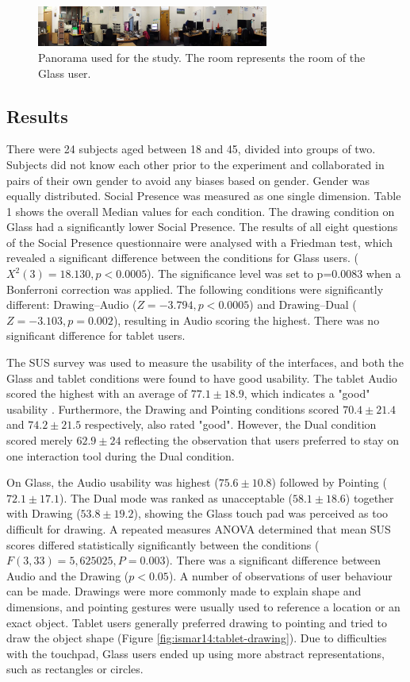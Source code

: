 \begin{figure}[ht]
	\centering
	\includegraphics[width=3in]{images/ismar14/envrionment-setup}
	\caption{Panorama used for the study. The room represents the room of the Glass user.}
	\label{fig:ismar14:envrionment-setup}
\end{figure}

\subsection{Results}

There were 24 subjects aged between 18 and 45, divided into groups of two. Subjects did not know each other prior to the experiment and collaborated in pairs of their own gender to avoid any biases based on gender. Gender was equally distributed. Social Presence was measured as one single dimension. Table 1 shows the overall Median values for each condition. The drawing condition on Glass had a significantly lower Social Presence. The results of all eight questions of the Social Presence questionnaire were analysed with a Friedman test, which revealed a significant difference between the conditions for Glass users. ($X^2(3)=18.130, p<0.0005$). The significance level was set to p=0.0083 when a Bonferroni correction was applied. The following conditions were significantly different: Drawing–Audio ($Z=-3.794, p<0.0005$) and Drawing–Dual ($Z=-3.103, p=0.002$), resulting in Audio scoring the highest. There was no significant difference for tablet users.

The SUS survey was used to measure the usability of the interfaces, and both the Glass and tablet conditions were found to have good usability. The tablet Audio scored the highest with an average of $77.1\pm18.9$, which indicates a "good" usability \cite{Bangor2008}. Furthermore, the Drawing and Pointing conditions scored $70.4\pm21.4$ and $74.2\pm21.5$ respectively, also rated "good". However, the Dual condition scored merely $62.9\pm24$ reflecting the observation that users preferred to stay on one interaction tool during the Dual condition.

On Glass, the Audio usability was highest ($75.6\pm10.8$) followed by Pointing ($72.1\pm17.1$). The Dual mode was ranked as unacceptable ($58.1\pm18.6$) together with Drawing ($53.8\pm19.2$), showing the Glass touch pad was perceived as too difficult for drawing. A repeated measures ANOVA determined that mean SUS scores differed statistically significantly between the conditions ($F(3, 33)=5,625025, P=0.003$). There was a significant difference between Audio and the Drawing ($p<0.05$). A number of observations of user behaviour can be made. Drawings were more commonly made to explain shape and dimensions, and pointing gestures were usually used to reference a location or an exact object. Tablet users generally preferred drawing to pointing and tried to draw the object shape (Figure \ref{fig:ismar14:tablet-drawing}). Due to difficulties with the touchpad, Glass users ended up using more abstract representations, such as rectangles or circles.


